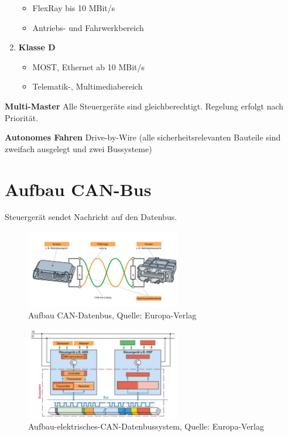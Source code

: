 \begin{enumerate}
  \begin{itemize}
  \item
    FlexRay bis 10 MBit/s
  \item
    Antriebs- und Fahrwerkbereich
  \end{itemize}
\item
  \textbf{Klasse D}

  \begin{itemize}
  \item
    MOST, Ethernet ab 10 MBit/s
  \item
    Telematik-, Multimediabereich
  \end{itemize}
\end{enumerate}

\textbf{Multi-Master} Alle Steuergeräte sind gleichberechtigt. Regelung
erfolgt nach Priorität.

\textbf{Autonomes Fahren} Drive-by-Wire (alle sicherheitsrelevanten
Bauteile sind zweifach ausgelegt und zwei Bussysteme)

\newpage

\section{Aufbau CAN-Bus}\label{aufbau-can-bus}

Steuergerät sendet Nachricht auf den Datenbus.

\begin{figure}[!ht]%
\centering
\includegraphics[width=0.6\textwidth]{images/CAN-Bus/CAN-Bus-2.pdf}
\caption{Aufbau CAN-Datenbus, Quelle: Europa-Verlag}
\end{figure}

\begin{figure}[!ht]%
\centering
\includegraphics[width=0.6\textwidth]{images/CAN-Bus/CAN-Bus-3.pdf}
\caption{Aufbau-elektrisches-CAN-Datenbussystem, Quelle: Europa-Verlag}
\end{figure}


